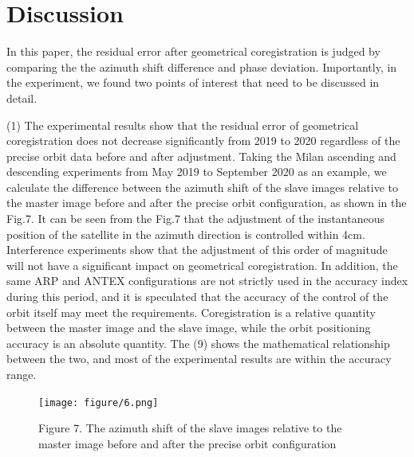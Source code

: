 \documentclass[a4paper,fleqn]{cas-dc}
\begin{document}
\section{Discussion}
In this paper, the residual error after geometrical coregistration is judged by comparing the the azimuth shift difference and phase deviation. Importantly, in the experiment, we found two points of interest that need to be discussed in detail. \par
(1) The experimental results show that the residual error of geometrical coregistration does not decrease significantly from 2019 to 2020 regardless of the precise orbit data before and after adjustment. Taking the Milan ascending and descending experiments from May 2019 to September 2020 as an example, we calculate the difference between the azimuth shift of the slave images relative to the master image before and after the precise orbit configuration, as shown in the Fig.7. It can be seen from the Fig.7 that the adjustment of the instantaneous position of the satellite in the azimuth direction is controlled within 4cm. Interference experiments show that the adjustment of this order of magnitude will not have a significant impact on geometrical coregistration. In addition, the same ARP and ANTEX configurations are not strictly used in the accuracy index during this period, and it is speculated that the accuracy of the control of the orbit itself may meet the requirements. Coregistration is a relative quantity between the master image and the slave image, while the orbit positioning accuracy is an absolute quantity. The (9) shows the mathematical relationship between the two, and most of the experimental results are within the accuracy range. \par
\begin{figure}
	\centering 
	\texttt{[image: figure/6.png]}	
	\caption{Figure 7. The azimuth shift of the slave images relative to the master image before and after the precise orbit configuration} 
	\label{fig_8}
\end{figure}
\end{document}
